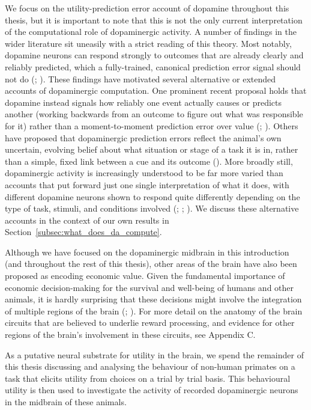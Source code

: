 We focus on the utility-prediction error account of dopamine throughout this thesis, but it is important to note that this is not the only current interpretation of the computational role of dopaminergic activity. A number of findings in the wider literature sit uneasily with a strict reading of this theory. Most notably, dopamine neurons can respond strongly to outcomes that are already clearly and reliably predicted, which a fully-trained, canonical prediction error signal should not do (\cite{howeProlongedDopamineSignalling2013}; \cite{hamidMesolimbicDopamineSignals2016}). These findings have motivated several alternative or extended accounts of dopaminergic computation. One prominent recent proposal holds that dopamine instead signals how reliably one event actually causes or predicts another (working backwards from an outcome to figure out what was responsible for it) rather than a moment-to-moment prediction error over value (\cite{jeongMesolimbicDopamineRelease2022}; \cite{namboodiriWhyDopamineCausal2024}). Others have proposed that dopaminergic prediction errors reflect the animal's own uncertain, evolving belief about what situation or stage of a task it is in, rather than a simple, fixed link between a cue and its outcome (\cite{starkweatherDopamineRewardPrediction2017}). More broadly still, dopaminergic activity is increasingly understood to be far more varied than accounts that put forward just one single interpretation of what it does, with different dopamine neurons shown to respond quite differently depending on the type of task, stimuli, and conditions involved (\cite{dabneyDistributionalCodeValue2020}; \cite{Lowet_Zheng_Meng_Matias_Drugowitsch_Uchida_2025}; \cite{sousaMultidimensionalDistributionalMap2025}). We discuss these alternative accounts in the context of our own results in Section~\ref{subsec:what_does_da_compute}.

Although we have focused on the dopaminergic midbrain in this introduction (and throughout the rest of this thesis), other areas of the brain have also been proposed as encoding economic value. Given the fundamental importance of economic decision-making for the survival and well-being of humans and other animals, it is hardly surprising that these decisions might involve the integration of multiple regions of the brain (\cite{grabenhorstPredictionEconomicChoice2012}; \cite{padoaschioppaNeuronsOrbitofrontalCortex2006}). For more detail on the anatomy of the brain circuits that are believed to underlie reward processing, and evidence for other regions of the brain's involvement in these circuits, see Appendix C.

As a putative neural substrate for utility in the brain, we spend the remainder of this thesis discussing and analysing the behaviour of non-human primates on a task that elicits utility from choices on a trial by trial basis. This behavioural utility is then used to investigate the activity of recorded dopaminergic neurons in the midbrain of these animals.
